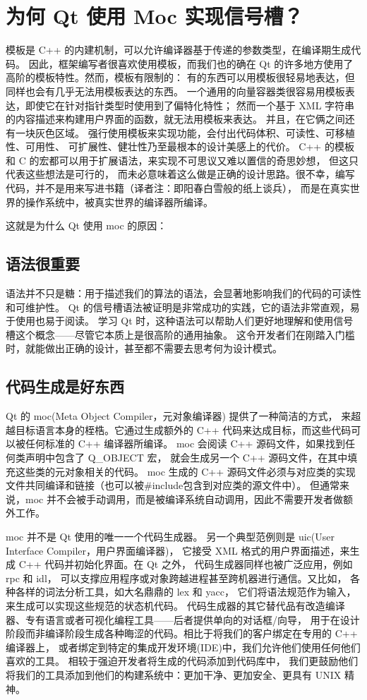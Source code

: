 \chapter{为何 Qt 使用 Moc 实现信号槽？}

模板是 C++ 的内建机制，可以允许编译器基于传递的参数类型，在编译期生成代码。
因此，框架编写者很喜欢使用模板，而我们也的确在 Qt 的许多地方使用了高阶的模板特性。然而，模板有限制的：
有的东西可以用模板很轻易地表达，但同样也会有几乎无法用模板表达的东西。
一个通用的向量容器类很容易用模板表达，即使它在针对指针类型时使用到了偏特化特性；
然而一个基于 XML 字符串的内容描述来构建用户界面的函数，就无法用模板来表达。
并且，在它俩之间还有一块灰色区域。
强行使用模板来实现功能，会付出代码体积、可读性、可移植性、可用性、
可扩展性、健壮性乃至最根本的设计美感上的代价。
C++ 的模板和 C 的宏都可以用于扩展语法，来实现不可思议又难以置信的奇思妙想，
但这只代表这些想法是可行的，
而未必意味着这么做是正确的设计思路。很不幸，编写代码，并不是用来写进书籍（译者注：即阳春白雪般的纸上谈兵），
而是在真实世界的操作系统中，被真实世界的编译器所编译。

这就是为什么 Qt 使用 moc 的原因：

\section{语法很重要}

语法并不只是糖：用于描述我们的算法的语法，会显著地影响我们的代码的可读性和可维护性。
Qt 的信号槽语法被证明是非常成功的实践，它的语法非常直观，易于使用也易于阅读。
学习 Qt 时，这种语法可以帮助人们更好地理解和使用信号槽这个概念——尽管它本质上是很高阶的通用抽象。
这令开发者们在刚踏入门槛时，就能做出正确的设计，甚至都不需要去思考何为设计模式。

\section{代码生成是好东西}

Qt 的 moc(Meta Object Compiler，元对象编译器) 提供了一种简洁的方式，
来超越目标语言本身的桎梏。它通过生成额外的 C++ 代码来达成目标，而这些代码可以被任何标准的 C++ 编译器所编译。
moc 会阅读 C++ 源码文件，如果找到任何类声明中包含了 Q\_OBJECT 宏，
就会生成另一个 C++ 源码文件，在其中填充这些类的元对象相关的代码。
moc 生成的 C++ 源码文件必须与对应类的实现文件共同编译和链接（也可以被\#include包含到对应类的源文件中）。
但通常来说，moc 并不会被手动调用，而是被编译系统自动调用，因此不需要开发者做额外工作。

moc 并不是 Qt 使用的唯一一个代码生成器。
另一个典型范例则是 uic(User Interface Compiler，用户界面编译器)，
它接受 XML 格式的用户界面描述，来生成 C++ 代码并初始化界面。在 Qt 之外，
代码生成器同样也被广泛应用，例如 rpc 和 idl，
可以支撑应用程序或对象跨越进程甚至跨机器进行通信。又比如，
各种各样的词法分析工具，如大名鼎鼎的 lex 和 yacc，
它们将语法规范作为输入，来生成可以实现这些规范的状态机代码。
代码生成器的其它替代品有改造编译器、专有语言或者可视化编程工具——后者提供单向的对话框/向导，
用于在设计阶段而非编译阶段生成各种晦涩的代码。相比于将我们的客户绑定在专用的 C++ 编译器上，
或者绑定到特定的集成开发环境(IDE)中，我们允许他们使用任何他们喜欢的工具。
相较于强迫开发者将生成的代码添加到代码库中，
我们更鼓励他们将我们的工具添加到他们的构建系统中：更加干净、更加安全、更具有 UNIX 精神。

